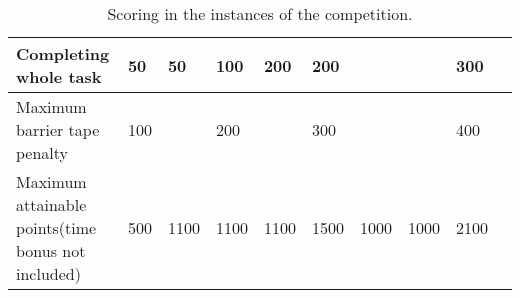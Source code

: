 \begin{landscape}
\begin{table}
\begin{tabular}{|p{5.5cm}*{9}{|P{1cm}}|}
    Completing whole task           &  50  &  50  &  100  &  200   &   200  &        &       &  300   \\ \hline\hline
    Maximum barrier \newline tape penalty    &  100  &      &  200  &       &  300  &       &       &  400  \\ \hline\hline
    Maximum attainable points\newline (time bonus not included)
	                                  & 500  & 1100 &  1100 & 1100  & 1500  & 1000  & 1000  &  2100 \\ \hline
 \end{tabular}
 \caption{Scoring in the instances of the \RCAW \YEAR competition.}
  \label{tab:InstancePoints}
\end{table}
\end{landscape}
